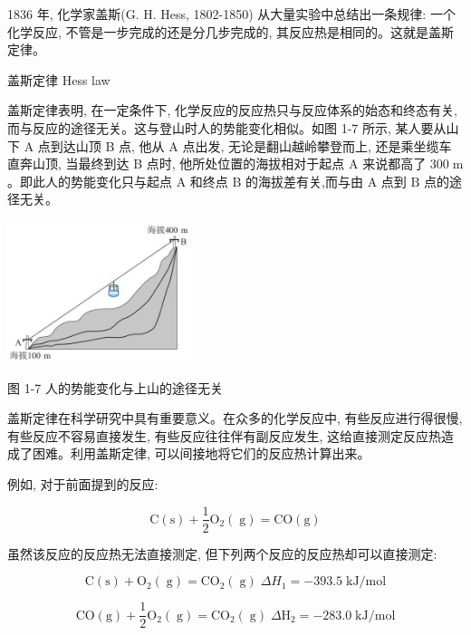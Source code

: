 \documentclass[10pt]{article}
\begin{document}
1836 年, 化学家盖斯(G. H. Hess, 1802-1850) 从大量实验中总结出一条规律: 一个化学反应, 不管是一步完成的还是分几步完成的, 其反应热是相同的。这就是盖斯定律。

\begin{mdframed}

盖斯定律 Hess law

\end{mdframed}

盖斯定律表明, 在一定条件下, 化学反应的反应热只与反应体系的始态和终态有关, 而与反应的途径无关。这与登山时人的势能变化相似。如图 1-7 所示, 某人要从山下 A 点到达山顶 B 点, 他从 A 点出发, 无论是翻山越岭攀登而上, 还是乘坐缆车直奔山顶, 当最终到达 B 点时, 他所处位置的海拔相对于起点 \(\mathrm{A}\) 来说都高了 \({300}\mathrm{\;m}\) 。即此人的势能变化只与起点 \(\mathrm{A}\) 和终点 \(\mathrm{B}\) 的海拔差有关,而与由 \(\mathrm{A}\) 点到 \(\mathrm{B}\) 点的途径无关。

\begin{center}
\includegraphics[max width=0.4\textwidth]{images/0190da9d-8bfd-732f-bc2c-0b21d0f13b91_20_737510.jpg}
\end{center}

图 1-7 人的势能变化与上山的途径无关

盖斯定律在科学研究中具有重要意义。在众多的化学反应中, 有些反应进行得很慢, 有些反应不容易直接发生, 有些反应往往伴有副反应发生, 这给直接测定反应热造成了困难。利用盖斯定律, 可以间接地将它们的反应热计算出来。

例如, 对于前面提到的反应:

\[
\mathrm{C}\left( \mathrm{s}\right) + \frac{1}{2}{\mathrm{O}}_{2}\left( \mathrm{\;g}\right) = \mathrm{{CO}}\left( \mathrm{g}\right)
\]

虽然该反应的反应热无法直接测定, 但下列两个反应的反应热却可以直接测定:

\[
\mathrm{C}\left( \mathrm{s}\right) + {\mathrm{O}}_{2}\left( \mathrm{\;g}\right) = {\mathrm{{CO}}}_{2}\left( \mathrm{\;g}\right) \;\Delta {H}_{1} = - {393.5}\mathrm{\;{kJ}}/\mathrm{{mol}}
\]

\[
\mathrm{{CO}}\left( \mathrm{g}\right) + \frac{1}{2}{\mathrm{O}}_{2}\left( \mathrm{\;g}\right) = {\mathrm{{CO}}}_{2}\left( \mathrm{\;g}\right) \;\Delta {\mathrm{H}}_{2} = - {283.0}\mathrm{\;{kJ}}/\mathrm{{mol}}
\]
\end{document}
